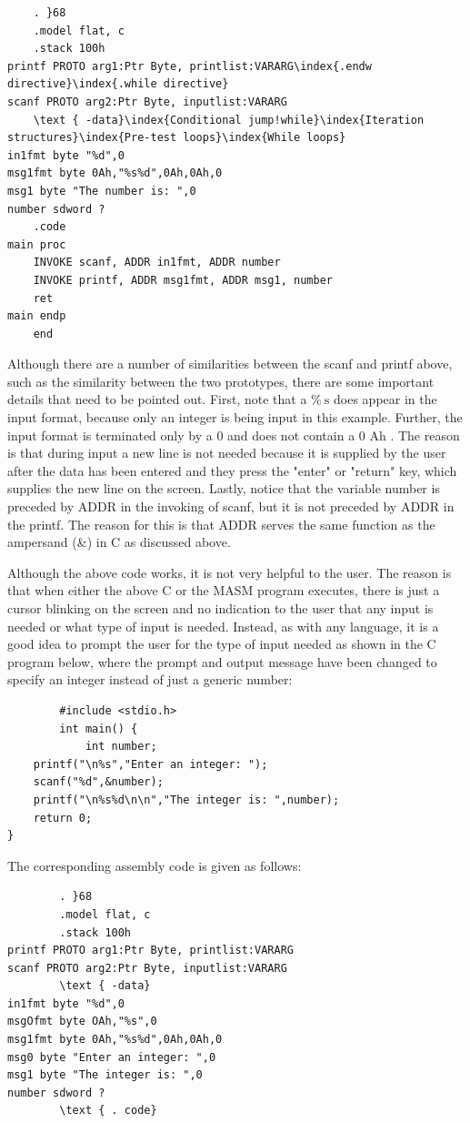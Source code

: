 \documentclass[10pt]{book}
\begin{document}
\begin{verbatim}
    . }68
    .model flat, c
    .stack 100h
printf PROTO arg1:Ptr Byte, printlist:VARARG\index{.endw directive}\index{.while directive}
scanf PROTO arg2:Ptr Byte, inputlist:VARARG
    \text { -data}\index{Conditional jump!while}\index{Iteration structures}\index{Pre-test loops}\index{While loops}
in1fmt byte "%d",0
msg1fmt byte 0Ah,"%s%d",0Ah,0Ah,0
msg1 byte "The number is: ",0
number sdword ?
    .code
main proc
    INVOKE scanf, ADDR in1fmt, ADDR number
    INVOKE printf, ADDR msg1fmt, ADDR msg1, number
    ret
main endp
    end
\end{verbatim}

Although there are a number of similarities between the scanf and printf above, such as the similarity between the two prototypes, there are some important details that need to be pointed out. First, note that a $\% \mathrm{~s}$ does appear in the input format, because only an integer is being input in this example. Further, the input format is terminated only by a 0 and does not contain a 0 Ah . The reason is that during input a new line is not needed because it is supplied by the user after the data has been entered and they press the "enter" or "return" key, which supplies the new line on the screen. Lastly, notice that the variable number is preceded by ADDR in the invoking of scanf, but it is not preceded by ADDR in the printf. The reason for this is that ADDR serves the same function as the ampersand (\&) in C as discussed above.

Although the above code works, it is not very helpful to the user. The reason is that when either the above C or the MASM program executes, there is just a cursor blinking on the screen and no indication to the user that any input is needed or what type of input is needed. Instead, as with any language, it is a good idea to prompt the user for the type of input needed as shown in the C program below, where the prompt and output message have been changed to specify an integer instead of just a generic number:

\begin{verbatim}
        #include <stdio.h>
        int main() {
            int number;
    printf("\n%s","Enter an integer: ");
    scanf("%d",&number);
    printf("\n%s%d\n\n","The integer is: ",number);
    return 0;
}
\end{verbatim}

The corresponding assembly code is given as follows:

\begin{verbatim}
        . }68
        .model flat, c
        .stack 100h
printf PROTO arg1:Ptr Byte, printlist:VARARG
scanf PROTO arg2:Ptr Byte, inputlist:VARARG
        \text { -data}
in1fmt byte "%d",0
msgOfmt byte OAh,"%s",0
msg1fmt byte 0Ah,"%s%d",0Ah,0Ah,0
msg0 byte "Enter an integer: ",0
msg1 byte "The integer is: ",0
number sdword ?
        \text { . code}
\end{verbatim}
\end{document}
